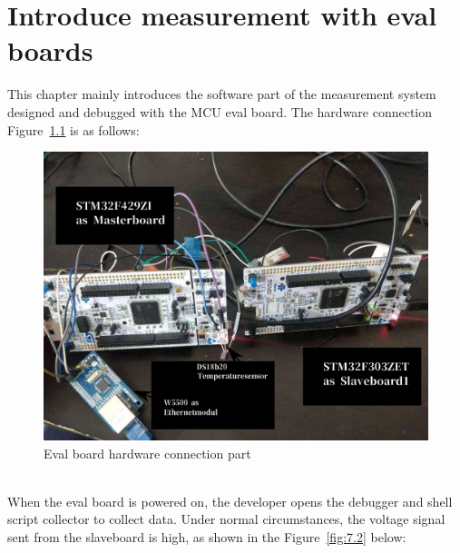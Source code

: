 \chapter{Introduce measurement with eval boards }
\label{chap:Introduce measurement with eval boards }
This chapter mainly introduces the software part of the measurement system designed and debugged with the MCU eval board. The hardware connection Figure~\ref{fig:7.1} is as follows:
\begin{figure}[!ht]
	\centering
	\includegraphics[width=16cm]{grafiken/7.1.eps}
	\caption{Eval board hardware connection part} 
	\label{fig:7.1}
\end{figure}
\FloatBarrier
\\
When the eval board is powered on, the developer opens the debugger and shell script collector to collect data. Under normal circumstances, the voltage signal sent from the slaveboard is high, as shown in the Figure~\ref{fig:7.2} below:

